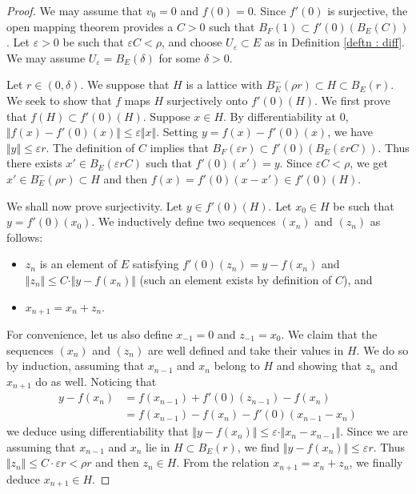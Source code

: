 \documentclass{lms}
\begin{document}
\begin{proof}
We may assume that $v_0=0$ and $f(0)=0$. Since $f'(0)$ is surjective, the open mapping theorem provides a $C>0$ such that 
$B_F(1) \subset f'(0)(B_E(C))$.
Let $\varepsilon>0$ be such that 
$\varepsilon C < \rho$, and choose $U_\varepsilon \subset E$ as in Definition 
\ref{deftn : diff}.  We may assume $U_\varepsilon = B_E(\delta)$ for some $\delta >0$.

Let $r \in (0, \delta)$. We suppose that $H$ is a lattice with 
$B^-_E(\rho r) \subset H \subset B_E(r).$
We seek to show that $f$ maps $H$ surjectively onto $f'(0) (H)$. We first prove 
that $f(H) \subset f'(0) (H)$. Suppose $x \in H$. By differentiability at 
$0$, $\Vert f(x)-f'(0)(x) \Vert \leq \varepsilon \Vert x \Vert $. 
Setting $y=f(x)-f'(0)(x)$, we have $\Vert y \Vert \leq 
\varepsilon r$. The definition of $C$ implies that $B_F(\varepsilon r) 
\subset f'(0) (B_E(\varepsilon rC))$. Thus there exists $x' 
\in B_E(\varepsilon r C)$ such that $f'(0) (x') =y$. Since 
$\varepsilon C < \rho$, we get $x' \in B^-_E(\rho r) \subset H$ and 
then $f(x)= f'(0) (x-x') \in f'(0) (H)$.

We shall now prove surjectivity. Let $y \in f'(0) (H)$. Let $x_0 \in H$ 
be such that $y = f'(0) (x_0)$. We inductively define two sequences 
$(x_n)$ and $(z_n)$ as follows:
\begin{itemize}
\item $z_n$ is an element of $E$ satisfying $f'(0)(z_n) = y - 
f(x_n)$ and $\Vert z_n \Vert \leq C \cdot \Vert y - f(x_n) \Vert$ (such 
an element exists by definition of $C$), and
\item $x_{n+1}=x_n+z_n$.
\end{itemize}
For convenience, let us also define $x_{-1} = 0$ and $z_{-1}=x_0.$ We claim that the 
sequences $(x_n)$ and $(z_n)$ are well defined and take their values in 
$H$. We do so by induction, assuming that $x_{n-1}$ and $x_n$ belong to $H$
and showing that $z_n$ and $x_{n+1}$ do as well. Noticing
that 
\begin{equation}
\label{eq:mainlemma}
\begin{aligned}
y - f(x_n) &= f(x_{n-1}) + f'(0)(z_{n-1}) - f(x_n) \\
&= f(x_{n-1}) - f(x_n) - f'(0)(x_{n-1} - x_n)
\end{aligned}
\end{equation}
we deduce using differentiability that
$\Vert y - f(x_n) \Vert \leq \varepsilon \cdot \Vert x_n - x_{n-1}
\Vert$.
Since we are assuming that $x_{n-1}$ and $x_n$ lie in $H \subset
B_E(r)$, we find $\Vert y - f(x_n) \Vert \leq \varepsilon r$. Thus
$\Vert z_n \Vert \leq C \cdot \varepsilon r < \rho r$ and then
$z_n \in H$. From the relation $x_{n+1} = x_n + z_n$, we finally
deduce $x_{n+1} \in H$.


\end{proof}
\end{document}
